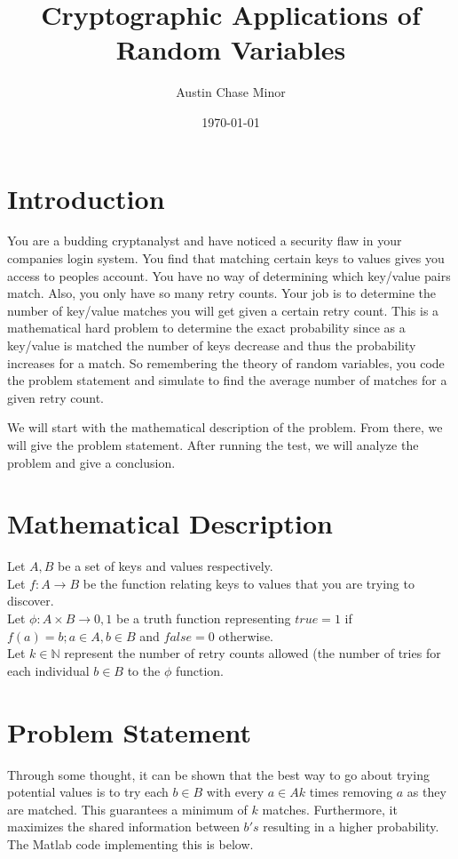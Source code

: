 \documentclass{article}
\author{Austin Chase Minor}
\title{Cryptographic Applications of Random Variables}
\date{\today}
\begin{document}
   \maketitle

   \section{Introduction}
   You are a budding cryptanalyst and have noticed a security
   flaw in your companies login system. You find that matching
   certain keys to values gives you access to peoples account.
   You have no way of determining which key/value pairs match.
   Also, you only have so many retry counts. 
   Your job is to determine the number of key/value matches you
   will get given a certain retry count. This is a mathematical
   hard problem to determine the exact probability since
   as a key/value is matched the number of keys decrease and thus
   the probability increases for a match. So remembering the theory
   of random variables, you code the problem statement and simulate
   to find the average number of matches for a given retry count.

   We will start with the mathematical description of the problem.
   From there, we will give the problem statement. After running the
   test, we will analyze the problem and give a conclusion.

   \section{Mathematical Description}
   \begin{flushleft}
      Let $A, B$ be a set of keys and values respectively.\\
      Let $f: A \to B$ be the function relating
      keys to values that you are trying to discover.\\
      Let $\phi: A \times B \to {0,1}$ be a truth
      function representing $true = 1$ if $f(a) = b; a \in A, b \in B$
      and $false = 0$ otherwise.\\
      Let $k \in \mathbb{N}$ represent the
      number of retry counts allowed (the number of tries for each individual
      $b \in B$ to the $\phi$ function.\\
   \end{flushleft}

   \section{Problem Statement}
      Through some thought, it can be shown that the best way to go
      about trying potential values is to try each $b \in B$ with
      every $a \in A k$ times removing $a$ as they are matched. This
      guarantees a minimum of $k$ matches. Furthermore, it maximizes the
      shared information between $b's$ resulting in a higher probability.
      The Matlab code implementing this is below.
\end{document}
